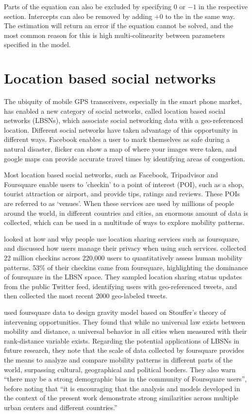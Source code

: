Parts of the equation can also be excluded by specifying $0$ or $-1$ in the respective section. Intercepts can also be removed by adding $+ 0$ to the in the same way. The estimation will return an error if the equation cannot be solved, and the most common reason for this is high multi-colinearity between parameters specified in the model.

\section{Location based social networks}
The ubiquity of mobile GPS transceivers, especially in the smart phone market, has enabled a new category of social networks, called location based social networks (LBSNs), which associate social networking data with a geo-referenced location. Different social networks have taken advantage of this opportunity in different ways. Facebook enables a user to mark themselves as safe during a natural disaster, flicker can show a map of where your images were taken, and google maps can provide accurate travel times by identifying areas of congestion. 

Most location based social networks, such as Facebook, Tripadvisor and Foursquare enable users to 'checkin' to a point of interest (POI), such as a shop, tourist attraction or airport, and provide tips, ratings and reviews. These POIs are referred to as `venues'. When these services are used by millions of people around the world, in different countries and cities, an enormous amount of data is collected, which can be used in a multitude of ways to explore mobility patterns. 

\textcite{lindqvist2011m} looked at how and why people use location sharing services such as foursquare, and discussed how users manage their privacy when using such services. \autocite{cheng2011exploring} collected 22 million checkins across 220,000 users to quantitatively assess human mobility patterns. 53\% of their checkins came from foursquare, highlighting the dominance of foursquare in the LBSN space. They sampled location sharing status updates from the public Twitter feed, identifying users with geo-referenced tweets, and then collected the most recent 2000 geo-labeled tweets.

\textcite{noulas2012tale} used foursquare data to design gravity model based on Stouffer's theory of intervening opportunities\parencite{stouffer1940intervening}. They found that while no universal law exists between mobility and distance, a universal behavior in all cities when measured with their rank-distance variable exists. Regarding the potential applications of LBSNs in future research, they note that the scale of data collected by foursquare provides the means to analyze and compare mobility patterns in different parts of the world, surpassing cultural, geographical and political borders. They also warn \enquote{there may be a strong demographic bias in the community of Foursquare users}, before noting that \enquote{it is encouraging that the analysis and models developed in the context of the present work demonstrate strong similarities across multiple urban centers and different countries.}

